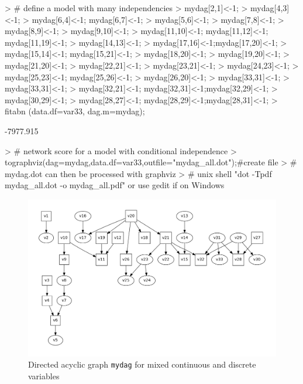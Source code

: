 \documentclass[nojss]{jss}
\begin{document}
\begin{Schunk}
\begin{Sinput}
> # define a model with many independencies
> mydag[2,1]<-1;
> mydag[4,3]<-1;
> mydag[6,4]<-1; mydag[6,7]<-1;
> mydag[5,6]<-1;
> mydag[7,8]<-1;  
> mydag[8,9]<-1;
> mydag[9,10]<-1;
> mydag[11,10]<-1; mydag[11,12]<-1; mydag[11,19]<-1;
> mydag[14,13]<-1;
> mydag[17,16]<-1;mydag[17,20]<-1;
> mydag[15,14]<-1; mydag[15,21]<-1;
> mydag[18,20]<-1;
> mydag[19,20]<-1;
> mydag[21,20]<-1;
> mydag[22,21]<-1;
> mydag[23,21]<-1;
> mydag[24,23]<-1;
> mydag[25,23]<-1; mydag[25,26]<-1;
> mydag[26,20]<-1;
> mydag[33,31]<-1;
> mydag[33,31]<-1;
> mydag[32,21]<-1; mydag[32,31]<-1;mydag[32,29]<-1;    
> mydag[30,29]<-1;
> mydag[28,27]<-1; mydag[28,29]<-1;mydag[28,31]<-1;       
> fitabn (data.df=var33, dag.m=mydag);
\end{Sinput}
\begin{Soutput}
[1] -7977.915
\end{Soutput}
\begin{Sinput}
> # network score for a model with conditional independence
> tographviz(dag=mydag,data.df=var33,outfile="mydag_all.dot");#create file
> # mydag.dot can then be processed with graphviz
> # unix shell "dot -Tpdf mydag_all.dot -o mydag_all.pdf" or use gedit if on Windows
\end{Sinput}
\end{Schunk}
\begin{figure}[htb]
\includegraphics{mydag_all}
\vspace{-1.0cm}
\caption{Directed acyclic graph {\tt mydag} for mixed continuous and discrete variables} \label{fig4}
\end{figure}
\end{document}

